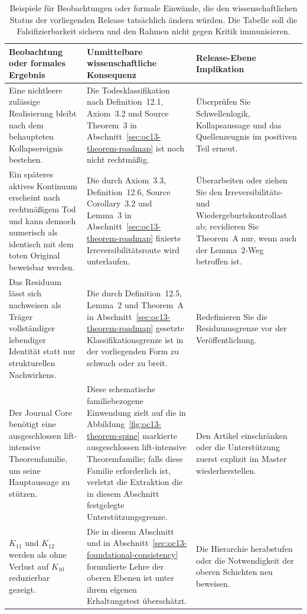 \begin{table}[htbp]
\centering
\begingroup
\footnotesize
\RaggedRight
\setlength{\tabcolsep}{4pt}
\begin{tabular}{@{}L{0.27\textwidth}L{0.36\textwidth}L{0.22\textwidth}@{}}
\toprule
\textbf{Beobachtung oder formales Ergebnis} & \textbf{Unmittelbare wissenschaftliche Konsequenz} & \textbf{Release-Ebene Implikation} \\
\midrule
Eine nichtleere zulässige Realisierung bleibt nach dem behaupteten Kollapsereignis bestehen. & Die Todesklassifikation nach Definition~12.1, Axiom~3.2 und Source Theorem~3 in Abschnitt~\ref{sec:oc13-theorem-roadmap} ist noch nicht rechtmäßig. & Überprüfen Sie Schwellenlogik, Kollapsaussage und das Quellenzeugnis im positiven Teil erneut. \\
Ein späteres aktives Kontinuum erscheint nach rechtmäßigem Tod und kann dennoch numerisch als identisch mit dem toten Original beweisbar werden. & Die durch Axiom~3.3, Definition~12.6, Source Corollary~3.2 und Lemma~3 in Abschnitt~\ref{sec:oc13-theorem-roadmap} fixierte Irreversibilitätsroute wird unterlaufen. & Überarbeiten oder ziehen Sie den Irreversibilitäts- und Wiedergeburtskontrollast ab; revidieren Sie Theorem~A nur, wenn auch der Lemma~2-Weg betroffen ist. \\
Das Residuum lässt sich nachweisen als Träger vollständiger lebendiger Identität statt nur strukturellen Nachwirkens. & Die durch Definition~12.5, Lemma~2 und Theorem~A in Abschnitt~\ref{sec:oc13-theorem-roadmap} gesetzte
Klassifikationsgrenze ist in der vorliegenden Form zu schwach oder zu breit. & Redefinieren Sie die Residuumsgrenze vor der Veröffentlichung. \\
Der Journal Core benötigt eine ausgeschlossen lift-intensive Theoremfamilie, um seine Hauptaussage zu
stützen. & Diese schematische familiebezogene Einwendung zielt auf die in
Abbildung~\ref{fig:oc13-theorem-spine} markierte ausgeschlossen lift-intensive Theoremfamilie; falls diese
Familie erforderlich ist, verletzt die Extraktion die in diesem Abschnitt festgelegte Unterstützungsgrenze. & Den Artikel einschränken oder die Unterstützung zuerst explizit im Master wiederherstellen. \\
\(K_{11}\) und \(K_{12}\) werden als ohne Verlust auf \(K_{10}\) reduzierbar gezeigt. & Die in diesem Abschnitt und in Abschnitt~\ref{sec:oc13-foundational-consistency} formulierte Lehre der oberen Ebenen ist
unter ihrem eigenen Erhaltungstest überschätzt. & Die Hierarchie herabstufen oder die Notwendigkeit der oberen Schichten neu beweisen. \\
\bottomrule
\end{tabular}
\endgroup
\caption{Beispiele für Beobachtungen oder formale Einwände, die den wissenschaftlichen Status der
vorliegenden Release tatsächlich ändern würden. Die Tabelle soll die Falsifizierbarkeit sichern und den Rahmen
nicht gegen Kritik immunisieren.}
\label{tab:oc13-counterexamples}
\end{table}

